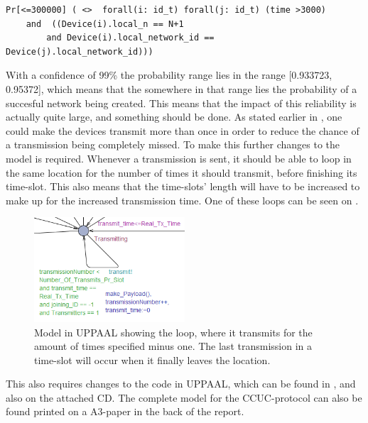 \begin{lstlisting}[style=UPPAAL, caption={Query for UPPAAL which asks for the probability of all devices in a network being equal to the number of devices in the system, and that they all have the same \texttt{network\_id}}, label={query-SuccesfulCreate}]
Pr[<=300000] ( <>  forall(i: id_t) forall(j: id_t) (time >3000) 
	and  ((Device(i).local_n == N+1 
		and Device(i).local_network_id == Device(j).local_network_id)))
\end{lstlisting}

With a confidence of 99\% the probability range lies in the range [0.933723, 0.95372], which means that the somewhere in that range lies the probability of a succesful network being created.
This means that the impact of this reliability is actually quite large, and something should be done.
As stated earlier in , one could make the devices transmit more than once in order to reduce the chance of a transmission being completely missed.
To make this further changes to the model is required.
Whenever a transmission is sent, it should be able to loop in the same location for the number of times it should transmit, before finishing its time-slot. 
This also means that the time-slots' length will have to be increased to make up for the increased transmission time.
One of these loops can be seen on .

\begin{figure}
\centering
  \includegraphics[width=0.5\textwidth]{Figures/Model/Transmit_Loop.png} 
\caption{Model in UPPAAL showing the loop, where it transmits for the amount of times specified minus one. The last transmission in a time-slot will occur when it finally leaves the location.}
\label{LoopTransmitUPPAAL}
\end{figure}

This also requires changes to the code in UPPAAL, which can be found in , and also on the attached CD.
The complete model for the CCUC-protocol can also be found printed on a A3-paper in the back of the report.

